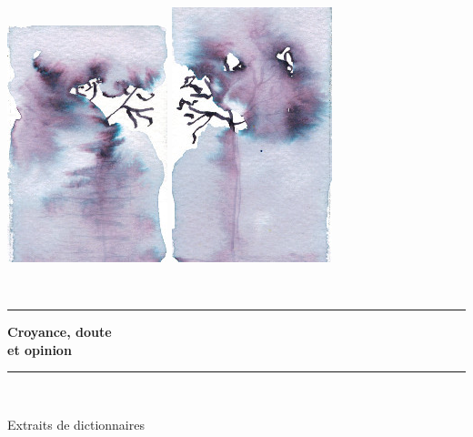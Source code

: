 \begin{titlepage}
%
\newcommand{\HRule}{\rule{\linewidth}{0.5mm}}

\begin{center}
\includegraphics[scale=0.5]{./presentation/gauche}
\hspace{1cm}
\includegraphics[scale=0.5]{./presentation/droite}
\end{center}

\textsc{\Large }\\[0.5cm]

\HRule

\begin{center}
{\Huge \bfseries  Croyance, doute\\
et opinion\\[0.4cm] }
\end{center}

\HRule \\[1.5cm]


\vfill

\begin{flushright} \huge
Extraits de dictionnaires
\end{flushright}


\end{titlepage}
